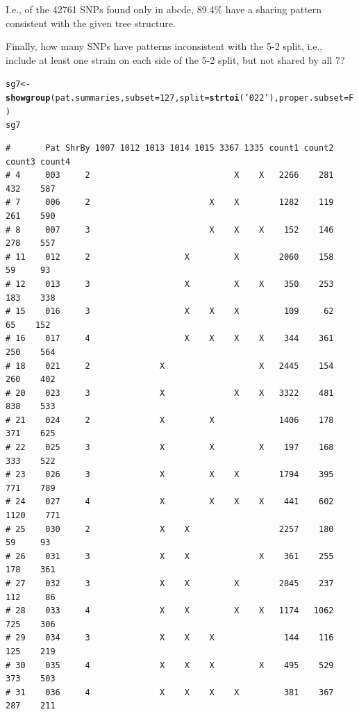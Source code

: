 \documentclass{article}\usepackage[]{graphicx}\usepackage[]{color}
\makeatletter
\newcommand{\hlnum}[1]{\textcolor[rgb]{0.686,0.059,0.569}{#1}}%
\newcommand{\hlstr}[1]{\textcolor[rgb]{0.192,0.494,0.8}{#1}}%
\newcommand{\hlstd}[1]{\textcolor[rgb]{0.345,0.345,0.345}{#1}}%
\newcommand{\hlkwb}[1]{\textcolor[rgb]{0.69,0.353,0.396}{#1}}%
\newcommand{\hlkwc}[1]{\textcolor[rgb]{0.333,0.667,0.333}{#1}}%
\newcommand{\hlkwd}[1]{\textcolor[rgb]{0.737,0.353,0.396}{\textbf{#1}}}%
\newenvironment{kframe}{%
 \def\at@end@of@kframe{}%
 \ifinner\ifhmode%
  \def\at@end@of@kframe{\end{minipage}}%
  \begin{minipage}{\columnwidth}%
 \fi\fi%
 \def\FrameCommand##1{\hskip\@totalleftmargin \hskip-\fboxsep
 \colorbox{shadecolor}{##1}\hskip-\fboxsep
     \hskip-\linewidth \hskip-\@totalleftmargin \hskip\columnwidth}%
 \MakeFramed {\advance\hsize-\width
   \@totalleftmargin\z@ \linewidth\hsize
   \@setminipage}}%
 {\par\unskip\endMakeFramed%
 \at@end@of@kframe}
\newenvironment{knitrout}{}{} %
\makeatother
\begin{document}
I.e., of the 42761 SNPs found only in abcde, 89.4\% have a sharing pattern consistent with the given tree structure.

Finally, how many SNPs have patterns inconsistent with the 5-2 split, i.e., include at least one strain on each side of the 5-2 split, but not shared by all 7?

\begin{knitrout}\footnotesize
{}\color{fgcolor}\begin{kframe}
\begin{alltt}
\hlstd{sg7} \hlkwb{<-} \hlkwd{showgroup}\hlstd{(pat.summaries,} \hlkwc{subset}\hlstd{=}\hlnum{127}\hlstd{,} \hlkwc{split}\hlstd{=}\hlkwd{strtoi}\hlstd{(}\hlstr{'022'}\hlstd{),} \hlkwc{proper.subset}\hlstd{=F)}
\hlstd{sg7}
\end{alltt}
\begin{verbatim}
#       Pat ShrBy 1007 1012 1013 1014 1015 3367 1335 count1 count2 count3 count4
# 4     003     2                             X    X   2266    281    432    587
# 7     006     2                        X    X        1282    119    261    590
# 8     007     3                        X    X    X    152    146    278    557
# 11    012     2                   X         X        2060    158     59     93
# 12    013     3                   X         X    X    350    253    183    338
# 15    016     3                   X    X    X         109     62     65    152
# 16    017     4                   X    X    X    X    344    361    250    564
# 18    021     2              X                   X   2445    154    260    402
# 20    023     3              X              X    X   3322    481    838    533
# 21    024     2              X         X             1406    178    371    625
# 22    025     3              X         X         X    197    168    333    522
# 23    026     3              X         X    X        1794    395    771    789
# 24    027     4              X         X    X    X    441    602   1120    771
# 25    030     2              X    X                  2257    180     59     93
# 26    031     3              X    X              X    361    255    178    361
# 27    032     3              X    X         X        2845    237    112     86
# 28    033     4              X    X         X    X   1174   1062    725    306
# 29    034     3              X    X    X              144    116    125    219
# 30    035     4              X    X    X         X    495    529    373    503
# 31    036     4              X    X    X    X         381    367    287    211

\end{verbatim}
\end{kframe}
\end{knitrout}
\end{document}
